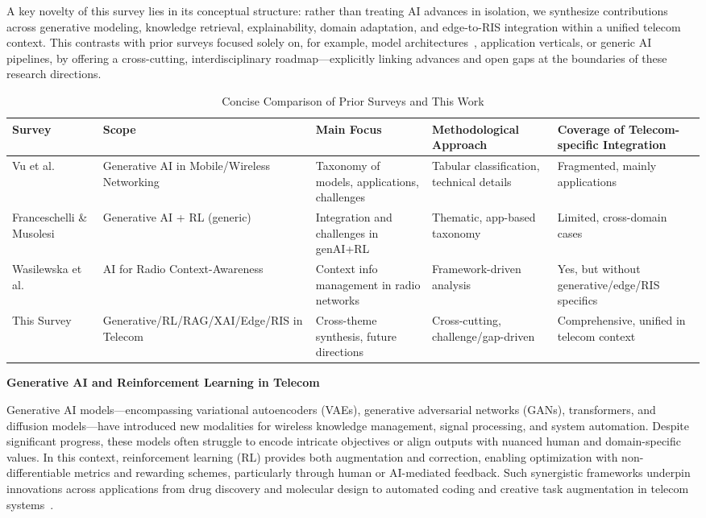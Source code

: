 \documentclass[sigconf]{acmart}
\begin{document}
A key novelty of this survey lies in its conceptual structure: rather than treating AI advances in isolation, we synthesize contributions across generative modeling, knowledge retrieval, explainability, domain adaptation, and edge-to-RIS integration within a unified telecom context. This contrasts with prior surveys focused solely on, for example, model architectures~\cite{ref44}, application verticals, or generic AI pipelines, by offering a cross-cutting, interdisciplinary roadmap—explicitly linking advances and open gaps at the boundaries of these research directions.

\begin{table*}[htbp]
\centering
\caption{Concise Comparison of Prior Surveys and This Work}
\label{tab:survey_comparison}
\begin{adjustbox}{max width=\textwidth}
\begin{tabular}{@{}lllll@{}}
\toprule
Survey & Scope & Main Focus & Methodological Approach & Coverage of Telecom-specific Integration \\
\midrule
Vu et al.~\cite{ref44} & Generative AI in Mobile/Wireless Networking & Taxonomy of models, applications, challenges & Tabular classification, technical details & Fragmented, mainly applications \\
Franceschelli \& Musolesi~\cite{ref1} & Generative AI + RL (generic) & Integration and challenges in genAI+RL & Thematic, app-based taxonomy & Limited, cross-domain cases\\
Wasilewska et al.~\cite{ref28} & AI for Radio Context-Awareness & Context info management in radio networks & Framework-driven analysis & Yes, but without generative/edge/RIS specifics\\
This Survey & Generative/RL/RAG/XAI/Edge/RIS in Telecom & Cross-theme synthesis, future directions & Cross-cutting, challenge/gap-driven & Comprehensive, unified in telecom context\\
\bottomrule
\end{tabular}
\end{adjustbox}
\end{table*}

\textbf{Generative AI and Reinforcement Learning in Telecom}

Generative AI models—encompassing variational autoencoders (VAEs), generative adversarial networks (GANs), transformers, and diffusion models—have introduced new modalities for wireless knowledge management, signal processing, and system automation. Despite significant progress, these models often struggle to encode intricate objectives or align outputs with nuanced human and domain-specific values. In this context, reinforcement learning (RL) provides both augmentation and correction, enabling optimization with non-differentiable metrics and rewarding schemes, particularly through human or AI-mediated feedback. Such synergistic frameworks underpin innovations across applications from drug discovery and molecular design to automated coding and creative task augmentation in telecom systems~\cite{ref1, ref2, ref3, ref4, ref5, ref6}.
\end{document}
